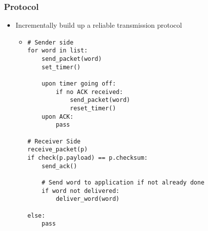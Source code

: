 \subsubsection{Protocol}
\begin{itemize}
    \item Incrementally build up a reliable transmission protocol
        \begin{itemize}
            \item
\begin{verbatim}
# Sender side
for word in list:
    send_packet(word)
    set_timer()

    upon timer going off:
        if no ACK received:
            send_packet(word)
            reset_timer()
    upon ACK:
        pass

# Receiver Side
receive_packet(p)
if check(p.payload) == p.checksum:
    send_ack()

    # Send word to application if not already done
    if word not delivered:
        deliver_word(word)

else:
    pass


\end{verbatim}
\end{itemize}
\end{itemize}
